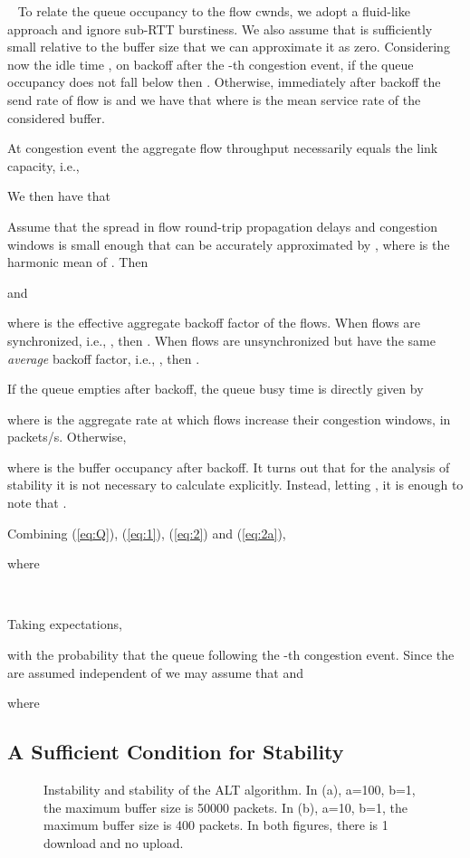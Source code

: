 \documentclass[10pt,twocolumn, journal]{IEEEtran}
\def\DLaddition#1{\noindent\ {\color{black} #1}}
\begin{document}
\DLaddition{To relate the queue occupancy to the flow cwnds, we adopt a fluid-like approach and ignore sub-RTT burstiness.   We also assume that  is sufficiently small relative to the buffer size that we can approximate it as zero.    Considering now the idle time , on backoff after the -th congestion event, if the queue occupancy does not fall below  then .  Otherwise, immediately after backoff the send rate of flow  is  and we have that}
 where  is the mean service rate of the considered
buffer.

At congestion event  the aggregate flow throughput necessarily equals the link
capacity, i.e.,


We then have that
\DLaddition{

 Assume that the spread in flow round-trip propagation delays and congestion windows is small enough that  can be accurately approximated by , where  is the harmonic mean of .  Then  
 
and
}
where  is the
effective aggregate backoff factor of the flows.    When flows are synchronized, i.e.,
, then . When flows are
unsynchronized
but have the same \emph{average}
backoff factor, i.e., , then  .

If the queue empties after backoff, the queue busy time  is directly given by

where  is the aggregate rate at which flows increase their
congestion windows, in packets/s.  Otherwise,

where  is the buffer occupancy after backoff.   It turns out that for the analysis
of stability it is not necessary to calculate  explicitly. Instead, letting
, it is enough to note that .

Combining (\ref{eq:Q}), (\ref{eq:1}), (\ref{eq:2}) and (\ref{eq:2a}),

where

\DLaddition{
Taking expectations,

with  the probability that the queue  following the -th congestion event.
Since the  are assumed independent of  we may assume that  and

where

}


\subsection{A Sufficient Condition for Stability}\label{subsec_stability}

\begin{figure}[tb]
   \centering
   \caption{Instability and stability of the ALT algorithm.
   In (a), a=100, b=1, the maximum buffer size is 50000 packets.
   In (b), a=10, b=1, the maximum buffer size is 400 packets.
   In both figures, there is 1 download and no upload.}
   \label{fig_stability}
\end{figure}
\end{document}
